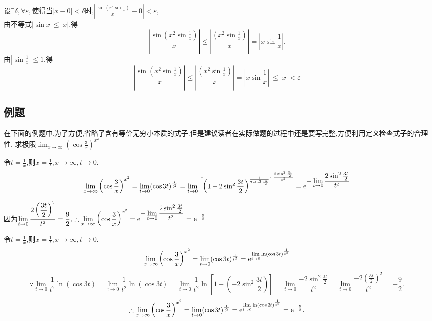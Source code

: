 \solve 设$\exists \delta, \forall \varepsilon,$使得当$|x-0|<\delta$时,$\displaystyle \left| \frac{\sin \left( x^2\sin\frac{1}{x}\right) }{x}-0\right|<\varepsilon$,\\[0.5em]
由不等式$|\sin x|\le |x|$,得
\[
\left| \frac{\sin \left( x^2\sin\frac{1}{x}\right) }{x}\right| \le \left| \frac{ \left( x^2\sin\frac{1}{x}\right) }{x}\right| =\left| x \sin \frac{1}{x} \right|.
\]
由$\displaystyle \left| \sin \frac{1}{x} \right| \le 1$,得
\[
\left| \frac{\sin \left( x^2\sin\frac{1}{x}\right) }{x}\right| \le \left| \frac{ \left( x^2\sin\frac{1}{x}\right) }{x}\right| =\left| x \sin \frac{1}{x} \right|.\le |x|<\varepsilon
\]

\subsection{例题}
\sj
\example[等价无穷小的运用]
在下面的例题中,为了方便,省略了含有等价无穷小本质的式子.但是建议读者在实际做题的过程中还是要写完整,方便利用定义检查式子的合理性.
\examples 求极限$\displaystyle \lim_{x \to \infty}\left(\cos \frac{3}{x} \right)^{x^2} $

\solve 令$\displaystyle t=\frac{1}{x}$,则$x=\frac{1}{t},x\to \infty ,t \to 0.$
\[
\lim_{x \to \infty}\left(\cos \frac{3}{x} \right)^{x^2} =\lim_{t \to 0}(\cos 3t)^{\frac{1}{t^2}}=\lim_{t \to 0}\left[\left( 1-2\sin^2\frac{3t}{2}\right)^{\frac{1}{2\sin^2\frac{3t}{2}}} \right]^{\frac{2\sin^2\frac{3t}{2}}{t^2}} ={\rm{e}}^{\displaystyle -\lim_{t \to 0}\frac{2\sin^2\frac{3t}{2}}{t^2}}
\]
因为$\displaystyle \lim_{t \to 0}\frac{2\left( \displaystyle \frac{3t}{2}\right)^2 }{t^2}=\frac{9}{2},\,\therefore \lim_{x \to \infty }\left(\cos \frac{3}{x} \right)^{x^2}={\rm{e}}^{ \displaystyle  -\lim_{t \to 0}\frac{2\sin^2\frac{3t}{2}}{t^2}}={\rm{e}} ^{-\frac{9}{2}} $

\solveother 令$\displaystyle t=\frac{1}{x}$,则$\displaystyle x=\frac{1}{t},x\to \infty ,t \to 0.$
\[
\lim_{x \to \infty}\left( \cos \frac{3}{x}\right)^{x^2} =\lim_{t \to 0}(\cos 3t)^{\frac{1}{t^2}}={\rm{e}}^{\lim\limits_{t \to 0}\ln(\cos 3t)^{\frac{1}{t^2}}}
\]
\[
\because \lim\limits_{t \to 0}\frac{1}{t^2}\ln(\cos 3t)=\lim\limits_{t \to 0}\frac{1}{t^2}\ln (\cos 3t)=\lim\limits_{t \to 0}\frac{1}{t^2}\ln \left[1+\left(-2\sin^2\frac{3t}{2}\right)\right]=\lim_{t \to 0}\frac{-2\sin^2\frac{3t}{2}}{t^2}=\lim\limits_{t \to 0}\frac{-2\left(\frac{3t}{2}\right)^2}{t^2}=-\frac{9}{2}.
\]
\[
\therefore \lim_{x \to \infty}\left( \cos \frac{3}{x}\right)^{x^2}=\lim\limits_{t \to 0}(\cos 3t)^{\frac{1}{t^2}}={\rm{e}}^{\lim\limits_{t \to 0}\ln(\cos 3t)^{\frac{1}{t^2}}}={\rm{e}}^{-\frac{9}{2}}.
\]

